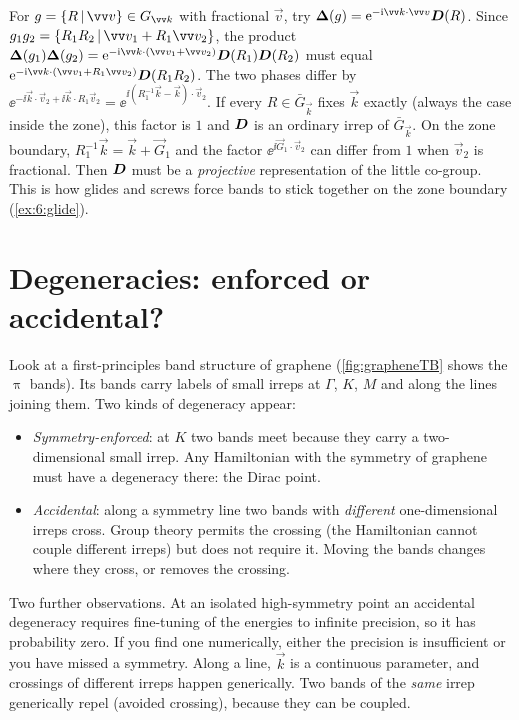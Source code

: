 \begin{beyond}
For $g=\seitz{R}{\vec{v}}\in G_{\vec{k}}$ with fractional $\vec{v}$, try
$\mat{\Delta}(g)=\ee^{-\ii\vec{k}\cdot\vec{v}}\mat{D}(R)$. Since
$g_1g_2=\seitz{R_1R_2}{\vec{v}_1+R_1\vec{v}_2}$, the product
$\mat{\Delta}(g_1)\mat{\Delta}(g_2)=\ee^{-\ii\vec{k}\cdot(\vec{v}_1+\vec{v}_2)}\mat{D}(R_1)\mat{D}(R_2)$
must equal $\ee^{-\ii\vec{k}\cdot(\vec{v}_1+R_1\vec{v}_2)}\mat{D}(R_1R_2)$. The two phases
differ by $\ee^{-\ii\vec{k}\cdot\vec{v}_2+\ii\vec{k}\cdot R_1\vec{v}_2}=
\ee^{\ii(R_1^{-1}\vec{k}-\vec{k})\cdot\vec{v}_2}$. If every $R\in\bar{G}_{\vec{k}}$ fixes
$\vec{k}$ exactly (always the case inside the zone), this factor is $1$ and $\bm{D}$
is an ordinary irrep of $\bar{G}_{\vec{k}}$. On the zone boundary,
$R_1^{-1}\vec{k}=\vec{k}+\vec{G}_1$ and the factor $\ee^{\ii\vec{G}_1\cdot\vec{v}_2}$ can
differ from $1$ when $\vec{v}_2$ is fractional. Then $\bm{D}$ must be a
\emph{projective} representation of the little co-group. This is how glides and screws
force bands to stick together on the zone boundary (\cref{ex:6:glide}).
\end{beyond}

\section{Degeneracies: enforced or accidental?}\label{sec:accidental}

Look at a first-principles band structure of graphene (\cref{fig:grapheneTB} shows the
$\uppi$ bands). Its bands carry labels of small irreps at $\Gamma$, $K$, $M$ and along the
lines joining them. Two kinds of degeneracy appear:
\begin{itemize}
\item \emph{Symmetry-enforced}: at $K$ two bands meet because they carry a
      two-dimensional small irrep. Any Hamiltonian with the symmetry of graphene must
      have a degeneracy there: the Dirac point.
\item \emph{Accidental}: along a symmetry line two bands with \emph{different}
      one-dimensional irreps cross. Group theory permits the crossing (the
      Hamiltonian cannot couple different irreps) but does not require it.
      Moving the bands changes where they cross, or removes the crossing.
\end{itemize}
Two further observations. At an isolated high-symmetry point an accidental
degeneracy requires fine-tuning of the energies to infinite precision, so it has
probability zero. If you find one numerically, either the precision is insufficient
or you have missed a symmetry. Along a line, $\vec{k}$ is a continuous parameter, and
crossings of different irreps happen generically. Two bands of the \emph{same} irrep
generically repel (avoided crossing), because they can be coupled.

